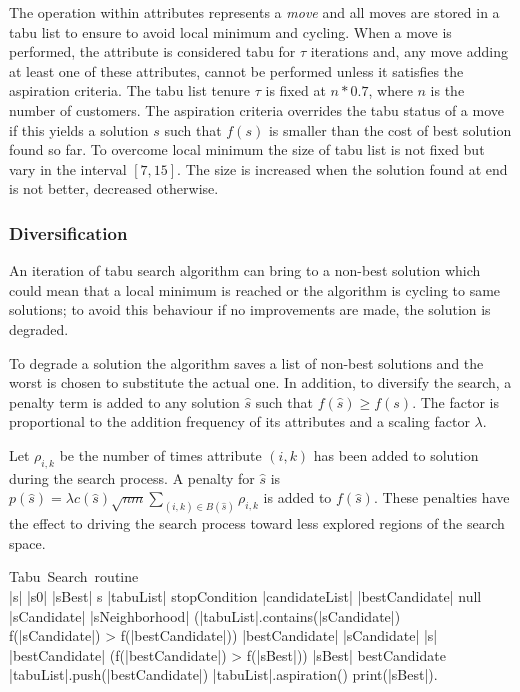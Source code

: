 \documentclass[twoside]{article}
\begin{document}
\begin{multicols}{2}
The operation within attributes represents a \textit{move} and all moves are stored in a tabu list to ensure to avoid local minimum and cycling.\newline
When a move is performed, the attribute is considered tabu for $\tau$ iterations and, any move adding at least one of these attributes, cannot be performed unless it satisfies the aspiration criteria.
The tabu list tenure $\tau$ is fixed at $n*0.7$, where $n$ is the number of customers.\newline
The aspiration criteria overrides the tabu status of a move if this yields a solution $s$ such that $f(s)$ is smaller than the cost of best solution found so far.\newline
To overcome local minimum the size of tabu list is not fixed but vary in the interval $[7, 15]$. The size is increased when the solution found at end is not better, decreased otherwise.

\subsubsection{Diversification}
An iteration of tabu search algorithm can bring to a non-best solution which could mean that a local minimum is reached or the algorithm is cycling to same solutions; to avoid this behaviour if no improvements are made, the solution is degraded.

To degrade a solution the algorithm saves a list of non-best solutions and the worst is chosen to substitute the actual one.\newline
In addition, to diversify the search, a penalty term is added to any solution $\hat{s}$ such that $f(\hat{s}) \ge f(s)$. The factor is proportional to the addition frequency of its attributes and a scaling factor $\lambda$.

Let $\rho_{i,k}$ be the number of times attribute $(i,k)$ has been added to solution during the search process. A penalty for $\hat{s}$ is $p(\hat{s}) = \lambda c(\hat{s})\sqrt{nm}\sum_{(i,k)\in B(\hat{s})} \rho_{i,k}$ is added to $f(\hat{s})$. These penalties have the effect to driving the search process toward less explored regions of the search space.
\begin{program}
	\mbox{Tabu Search routine}
	\BEGIN \\
	|s| \gets |s0|
	|sBest| \gets s
	|tabuList| \gets []
	\WHILE \NOT stopCondition \DO
		|candidateList| \gets []
		|bestCandidate| \gets null
		\FOR |sCandidate| \in |sNeighborhood| \DO
			\IF (\NOT |tabuList|.contains(|sCandidate|) \OR \\ f(|sCandidate|) > f(|bestCandidate|))
			\THEN
				|bestCandidate| \gets |sCandidate|
			\FI
		\OD
		|s| \gets |bestCandidate|
		\IF (f(|bestCandidate|) > f(|sBest|))
		\THEN
			|sBest| \gets bestCandidate
		\FI
		|tabuList|.push(|bestCandidate|)
		|tabuList|.aspiration()
	\OD
	print(|sBest|).
	\END
\end{program}


\end{multicols}
\end{document}
